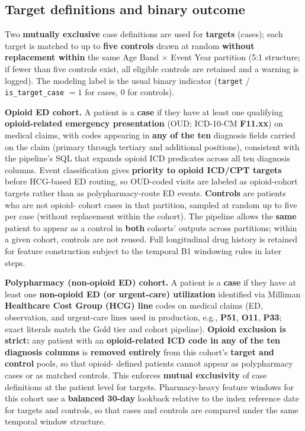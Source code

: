 \documentclass[
  12pt,
]{book}
\begin{document}
\subsection{Target definitions and binary
outcome}\label{target-definitions-and-binary-outcome}

Two \textbf{mutually exclusive} case definitions are used for
\textbf{targets} (cases); each target is matched to up to \textbf{five
controls} drawn at random \textbf{without replacement within} the same
Age Band \(\times\) Event Year partition (5:1 structure; if fewer than
five controls exist, all eligible controls are retained and a warning is
logged). The modeling label is the usual binary indicator
(\texttt{target} / \texttt{is\_target\_case} \(=1\) for cases, \(0\) for
controls).

\textbf{Opioid ED cohort.} A patient is a \textbf{case} if they have at
least one qualifying \textbf{opioid-related emergency presentation}
(OUD; ICD-10-CM \textbf{F11.xx}) on medical claims, with codes appearing
in \textbf{any of the ten} diagnosis fields carried on the claim
(primary through tertiary and additional positions), consistent with the
pipeline's SQL that expands opioid ICD predicates across all ten
diagnosis columns. Event classification gives \textbf{priority to opioid
ICD/CPT targets} before HCG-based ED routing, so OUD-coded visits are
labeled as opioid-cohort targets rather than as polypharmacy-route ED
events. \textbf{Controls} are patients who are not opioid- cohort cases
in that partition, sampled at random up to five per case (without
replacement within the cohort). The pipeline allows the \textbf{same}
patient to appear as a control in \textbf{both} cohorts' outputs across
partitions; within a given cohort, controls are not reused. Full
longitudinal drug history is retained for feature construction subject
to the temporal B1 windowing rules in later steps.

\textbf{Polypharmacy (non-opioid ED) cohort.} A patient is a
\textbf{case} if they have at least one \textbf{non-opioid ED (or
urgent-care) utilization} identified via Milliman \textbf{Healthcare
Cost Group (HCG) line} codes on medical claims (ED, observation, and
urgent-care lines used in production, e.g., \textbf{P51}, \textbf{O11},
\textbf{P33}; exact literals match the Gold tier and cohort pipeline).
\textbf{Opioid exclusion is strict:} any patient with an
\textbf{opioid-related ICD code in any of the ten diagnosis columns} is
\textbf{removed entirely} from this cohort's \textbf{target and control}
pools, so that opioid- defined patients cannot appear as polypharmacy
cases or as matched controls. This enforces \textbf{mutual exclusivity}
of case definitions at the patient level for targets. Pharmacy-heavy
feature windows for this cohort use a \textbf{balanced 30-day} lookback
relative to the index reference date for targets and controls, so that
cases and controls are compared under the same temporal window
structure.
\end{document}
